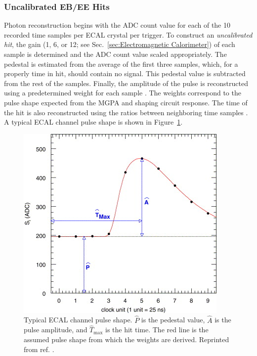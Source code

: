 \documentclass[dissertation.tex]{subfiles}
\begin{document}
\subsubsection{Uncalibrated EB/EE Hits}
\label{sec:Uncalibrated EB/EE Hits}

Photon reconstruction begins with the ADC count value for each of the 10 recorded time samples per ECAL crystal per trigger.  To construct an \textit{uncalibrated hit}, the gain (1, 6, or 12; see Sec.~\ref{sec:Electromagnetic Calorimeter}) of each sample is determined and the ADC count value scaled appropriately.  The pedestal is estimated from the average of the first three samples, which, for a properly time in hit, should contain no signal.  This pedestal value is subtracted from the rest of the samples.  Finally, the amplitude of the pulse is reconstructed using a predetermined weight for each sample \cite{Bruneliere}.  The weights correspond to the pulse shape expected from the MGPA and shaping circuit response.  The time of the hit is also reconstructed using the ratios between neighboring time samples \cite{time_reco}.  A typical ECAL channel pulse shape is shown in Figure~\ref{fig:pulse}.

\begin{figure}
	\centering
	\includegraphics[scale=2.0]{pulse}
	\caption{Typical ECAL channel pulse shape.  $\widehat{P}$ is the pedestal value, $\widehat{A}$ is the pulse amplitude, and $\widehat{T}_{\mathrm{max}}$ is the hit time.  The red line is the assumed pulse shape from which the weights are derived.  Reprinted from ref. \cite{Bruneliere}.}
	\label{fig:pulse}
\end{figure}
\end{document}
